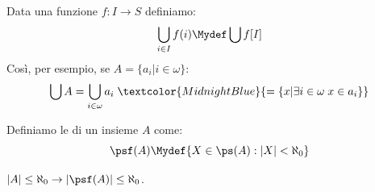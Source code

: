 \pagebreak

\begin{notation}
	Data una funzione $f : I \rightarrow S$ definiamo:
	\[ \bigcup_{i \in I} f(i) \Mydef \bigcup f[I]
		\]
	Così, per esempio, se $A = \{a_i | i \in \omega\}$:
	\[ \bigcup A = \bigcup_{i \in \omega} a_i \;\textcolor{MidnightBlue}{= \{x | \exists i \in \omega \; x \in a_i\}}
		\]
\end{notation}

\begin{definition}
	Definiamo le  di un insieme $A$ come:
	\[ \psf(A) \Mydef \{X \in \ps(A) : |X| < \aleph_0\}
		\]
\end{definition}

\begin{proposition}
	$|A| \leq \aleph_0 \rightarrow |\psf(A)| \leq \aleph_0$.
\end{proposition}

